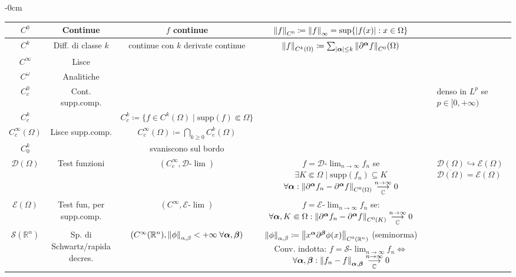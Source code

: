 \documentclass[a4paper,10pt]{article}
\theoremstyle{definition}
\newcommand{\bv}{\boldsymbol} %
\newcommand{\re}{\mathbb{R}} %
\newcommand{\im}{\mathbb{C}} %
\newcommand{\inj}{\hookrightarrow} %
\newcommand{\supp}{\text{supp}} %
\newcommand{\llim}[2]{#2\text{-}\lim_{#1\to\infty}} %
\newcommand{\limm}[2]{\overunderset{#1\to\infty}{#2}{\longrightarrow}} %
\theoremstyle{indentdefinition}
\theoremstyle{indenttheorem}
\theoremstyle{myremark}
\theoremstyle{indentgeneral}
\begin{document}
\begin{landscape}
\begin{adjustwidth}{}{-0cm}
\begin{table}[H]
\begin{tabular}{|c|c|c|c|c|l|}
 $C^0$& Continue& $f$ continue& $\norm{f}_{C^0}\coloneqq\norm{f}_\infty=\sup\{\abs{f(x)}:x\in\Omega\}$& &\\\hline
 $C^k$& Diff. di classe $k$& continue con $k$ derivate continue& $\norm{f}_{C^k(\Omega)}\coloneqq\sum_{\abs{\bv{\alpha}}\le k}\norm{\partial^{\bv{\alpha}}f}_{C^0}(\Omega)$& &\\ \hline 
 $C^\infty$& Lisce& & & &\\\hline
 $C^\omega$& Analitiche& & & &\\\hline\hline
 $C_c^0$& Cont. supp.comp.& & & &denso in $L^p$ se $p\in[0,+\infty)$\\\hline
 $C_c^k$& & $C_c^k\coloneqq\{f\in C^k(\Omega)\mid \supp(f)\Subset\Omega\}$& & &\\\hline
 $C_c^\infty(\Omega)$& Lisce supp.comp.& $C_c^\infty(\Omega)\coloneqq\bigcap_{k\ge0}C_c^k(\Omega)$& & &\\\hline
 $C_0^k$& & svaniscono sul bordo& & &\\\hline\hline
 $\mathcal{D}(\Omega)$&Test funzioni & $(C_c^{\infty},\mathcal{D}\text{-}\lim)$ & \shortstack{$f=\llim{n}{\mathcal{D}}f_n$ se \\ $\exists K\Subset \Omega\mid \supp(f_n)\subseteq K$ \\$\forall\bv{\alpha}:\norm{\partial^{\bv{\alpha}}f_n-\partial^{\bv{\alpha}}f}_{C^0(\Omega)}\limm{n}{\im}0$} & &\shortstack{$\mathcal{D}(\Omega)\inj\mathcal{E}(\Omega)$\\$\overline{\mathcal{D}(\Omega)}=\mathcal{E}(\Omega)$}\\ \hline 
 $\mathcal{E}(\Omega)$& Test fun, per supp.comp.& $(C^{\infty},\mathcal{E}\text{-}\lim)$& \shortstack{$f=\llim{n}{\mathcal{E}}f_n$ se:\\ $\forall\bv{\alpha},K\Subset \Omega:\norm{\partial^{\bv{\alpha}}f_n-\partial^{\bv{\alpha}}f}_{C^0(K)}\limm{n}{\im}0$}& & \\ \hline 
 $\mathcal{S}(\re^n)$& Sp. di Schwartz/rapida decres.& $(C^\infty(\re^n),\norm{\phi}_{\alpha,\beta}<+\infty\;\forall\bv{\alpha},\bv{\beta})$& \shortstack{$\norm{\phi}_{\alpha,\beta}\coloneqq\norm{x^{\bv{\alpha}}\partial^{\bv{\beta}}\phi(x)}_{C^0(\re^n)}$\\ (seminorma) \\
 Conv. indotta: $f=\llim{n}{\mathcal{S}}f_n\iff$\\ $\forall\bv{\alpha},\bv{\beta}:\norm{f_n-f}_{\bv{\alpha},\bv{\beta}}\limm{n}{\im}0$} & &\\ \hline
    \end{tabular}
\end{table}
\end{adjustwidth}



\end{landscape}
\end{document}
